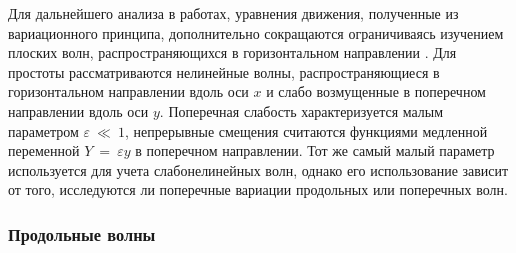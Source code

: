 %
%
Для дальнейшего анализа в работах, уравнения движения, полученные из вариационного принципа, дополнительно сокращаются ограничиваясь изучением плоских волн, распространяющихся в горизонтальном направлении \cite{porkros}. Для простоты рассматриваются нелинейные волны, распространяющиеся в горизонтальном направлении вдоль оси $ x $ и слабо возмущенные в поперечном направлении вдоль оси $y$. Поперечная слабость характеризуется малым параметром $\varepsilon ~ \ll ~ 1$, непрерывные смещения считаются функциями медленной переменной $Y ~=~ \varepsilon y$ в поперечном направлении. Тот же самый малый параметр используется для учета слабонелинейных волн, однако его использование зависит от того, исследуются ли поперечные вариации продольных или поперечных волн. 

\subsubsection{Продольные волны}

